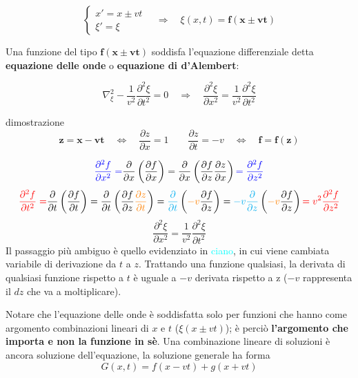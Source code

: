 \documentclass[x11names]{report}
\begin{document}
	\[ 
	\begin{cases} 
		x' = x\pm vt \\ \xi' = \xi 
	\end{cases} 
	\quad \Rightarrow \quad \xi(x,t) = \mathbf{f(x \pm vt)}
	\]
	
	Una funzione del tipo \(\mathbf{f(x \pm vt)}\) soddisfa l'equazione differenziale detta \textbf{equazione delle onde} o \textbf{equazione di d'Alembert}:
	
	\[ 
	\nabla^2_\xi- \frac{1}{v^2} \frac{\partial^2\xi}{\partial t^2} = 0 \quad \Rightarrow \quad \boxed{\frac{\partial^2\xi}{\partial x^2} = \frac{1}{v^2}\frac{\partial^2\xi}{\partial t^2}}
	\]
	
	\begin{es}{dimostrazione}
		\[ 
		\mathbf{z = x - vt} \quad \Longleftrightarrow \quad \boxed{\frac{\partial z}{\partial x} = 1}   \quad \quad \boxed{\frac{\partial z}{\partial t} = -v}  \quad \Longleftrightarrow \quad  \mathbf{f = f(z)}
		\]
		
		\[ 
		\textcolor{blue}{\frac{\partial^2 f}{\partial x^2} =} \frac{\partial}{\partial x}\left(\frac{\partial f}{\partial x}\right) =\frac{\partial}{\partial x}\left(\frac{\partial f}{\partial z}\frac{\partial z}{\partial x}\right)  \textcolor{blue}{=\frac{\partial^2 f}{\partial z^2}}
		\]
		\[ 
		\textcolor{red}{\frac{\partial^2 f}{\partial t^2} =} \frac{\partial}{\partial t}\left(\frac{\partial f}{\partial t}\right) =\frac{\partial}{\partial t}\left(\frac{\partial f}{\partial z}\textcolor{orange}{\frac{\partial z}{\partial t}}\right) =\textcolor{cyan}{\frac{\partial}{\partial t}}\left(\textcolor{orange}{-v}\frac{\partial f}{\partial z}\right) = \textcolor{cyan}{-v\frac{\partial }{\partial z}}\left(\textcolor{orange}{-v}\frac{\partial f}{\partial z}\right) \textcolor{red}{=v^2\frac{\partial^2 f}{\partial z^2}}
		\]
		\[ 
	    \frac{\partial^2\xi}{\partial x^2} = \frac{1}{v^2}\frac{\partial^2\xi}{\partial t^2}
		\]
		\newline
		Il passaggio più ambiguo è quello evidenziato in \textcolor{cyan}{ciano}, in cui viene cambiata variabile di derivazione da \(t\) a \(z\). Trattando una funzione qualsiasi, la derivata di qualsiasi funzione rispetto a \(t\) è uguale a \(-v\) derivata rispetto a z (\(-v\) rappresenta il \(dz\) che va a moltiplicare). 
	\end{es}	
	
	\noindent
	Notare che l'equazione delle onde è soddisfatta solo per funzioni che hanno come argomento combinazioni lineari di \(x\) e \(t\) (\(\xi(x \pm vt)\)); è perciò \textbf{l'argomento che importa e non la funzione in sè}. Una combinazione lineare di soluzioni è ancora soluzione dell'equazione, la soluzione generale ha forma
	\[ 
	G(x,t) = f(x-vt) + g(x+vt)
	\]
	
\end{document}
